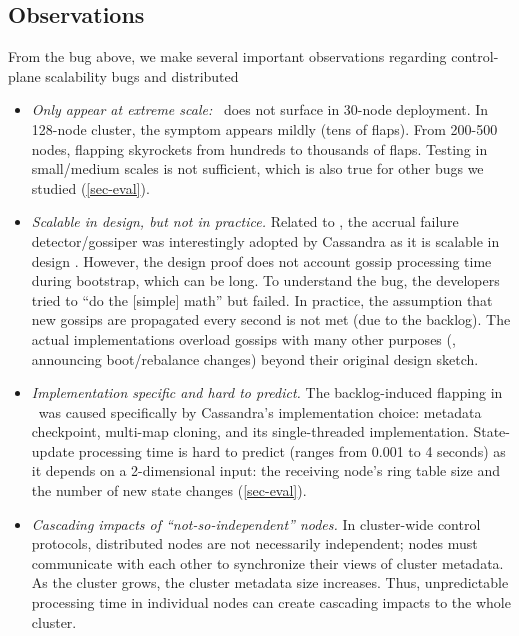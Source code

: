\subsection{Observations}
\label{sec-scobs}

From the bug above, we make several important observations regarding
control-plane scalability bugs and distributed

\begin{itemize}
\item {\em Only appear at extreme scale:} \caone\ does not surface in 30-node
deployment.  In 128-node cluster, the symptom appears mildly (tens of
flaps).  From 200-500 nodes, flapping skyrockets from hundreds to
thousands of flaps.  Testing in small/medium scales is not sufficient,
which is also true for other bugs we studied (\sec\ref{sec-eval}).

\item {\em Scalable in design, but not in practice.}  Related to \caone,
the accrual failure detector/gossiper
\cite{Hayashibara+04-PhiFailureDetector} was interestingly adopted by
Cassandra as it is scalable in design \cite{Lakshman+09-Cassandra}.
However, the design proof does not account gossip processing time during
bootstrap, which can be long.  To understand the bug, the developers tried
to ``do the [simple] math'' \cite{CA-One} but failed.  In practice, the
assumption that new gossips are propagated every second is not met (due to
the backlog).  The actual implementations overload gossips with many other
purposes (\eg, announcing boot/rebalance changes) beyond their original
design sketch.


\item {\em Implementation specific and hard to predict.}  The
backlog-induced flapping in \caone\ was caused specifically by Cassandra's
implementation choice: metadata checkpoint, multi-map cloning, and its
single-threaded implementation.  State-update processing time is hard to
predict (ranges from 0.001 to 4 seconds) as it depends on a 2-dimensional
input: the receiving node's ring table size and the number of new
state changes (\sec\ref{sec-eval}).

\item {\em Cascading impacts of ``not-so-independent'' nodes.}  In
cluster-wide control protocols, distributed nodes are  not
necessarily independent; nodes must communicate with each other
to synchronize their views of cluster metadata.  As the cluster grows, the
cluster metadata size increases.  Thus, unpredictable processing time in
individual nodes can create cascading impacts to the whole cluster.


\end{itemize}
